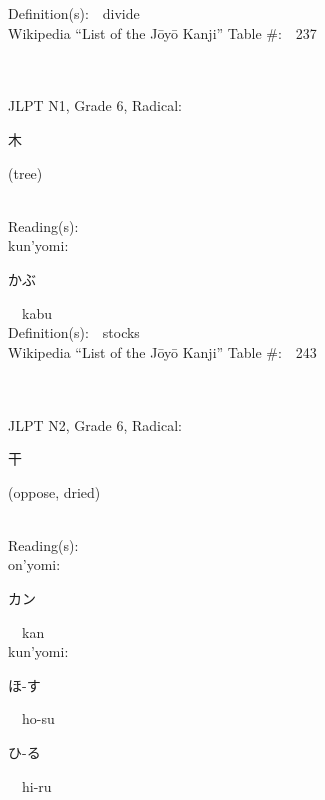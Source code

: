 \begin{multicols}{2}
Definition(s):\ \ divide \\
Wikipedia ``List of the J\=oy\=o Kanji'' Table \#:\ \ 237 \\
\ \ \\
{\fontsize{34pt}{40pt}  }\ \ \\  %
{JLPT N1, Grade 6, Radical:\ \ {\begin{CJK}{UTF8}{min} 木 \end{CJK}} (tree) } \\
Reading(s):\ \ \\
{\hspace*{1em}}kun'yomi:\ \ \\
{\hspace*{2em}}{\begin{CJK}{UTF8}{min} かぶ \end{CJK}}\ \ kabu\ \ \\
Definition(s):\ \ stocks \\
Wikipedia ``List of the J\=oy\=o Kanji'' Table \#:\ \ 243 \\
\ \ \\
{\fontsize{34pt}{40pt}  }\ \ \\  %
{JLPT N2, Grade 6, Radical:\ \ {\begin{CJK}{UTF8}{min} 干 \end{CJK}} (oppose, dried) } \\
Reading(s):\ \ \\
{\hspace*{1em}}on'yomi:\ \ \\
{\hspace*{2em}}{\begin{CJK}{UTF8}{min} カン \end{CJK}}\ \ kan\ \ \\
{\hspace*{1em}}kun'yomi:\ \ \\
{\hspace*{2em}}{\begin{CJK}{UTF8}{min} ほ-す \end{CJK}}\ \ ho-su\ \ \\
{\hspace*{2em}}{\begin{CJK}{UTF8}{min} ひ-る \end{CJK}}\ \ hi-ru\ \ \\

\end{multicols}

